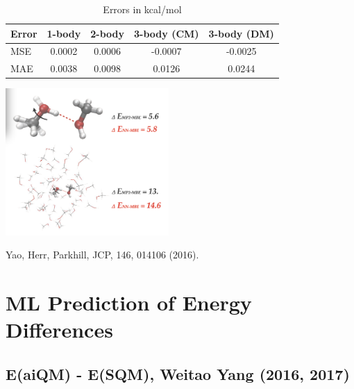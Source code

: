\documentclass[handout]{beamer} %
\begin{document}
\begin{frame}
\vspace{-3mm}
\begin{table}
\caption{Errors in kcal/mol} 
\begin{tabular}{lcccc}
\hline \hline 
Error  & 1-body & 2-body & 3-body (CM) & 3-body (DM) \\
\hline 
MSE & 0.0002 & 0.0006 & -0.0007 & -0.0025 \\
MAE & 0.0038 & 0.0098 & 0.0126 & 0.0244 \\
\hline \hline 
\end{tabular}
\end{table}

\begin{center}
\includegraphics[height=2.2in]{figures_ml/parkhill_methanol_dimer.png} 
\end{center}
\vspace{5mm}
\begin{center}
\footnotesize{Yao, Herr, Parkhill, JCP, 146, 014106 (2016).}
\end{center} 
\end{frame}

\section{ML Prediction of Energy Differences} 

\subsection{E(aiQM) - E(SQM), Weitao Yang (2016, 2017)}
\end{document}
